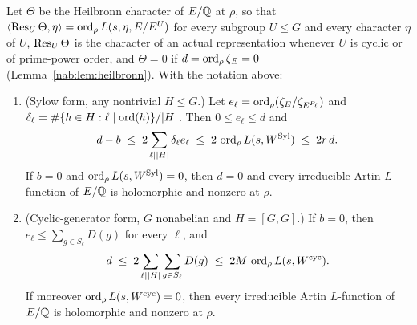 \begin{theorem}\label{nab:thm:heilbronn}
Let $\Theta$ be the Heilbronn character of $E/\mathbb{Q}$ at $\rho$, so that
$\langle\operatorname{Res}_U\Theta,\eta\rangle=\operatorname{ord}_\rho L(s,\eta,E/E^U)$ for every subgroup $U\le G$ and
every character $\eta$ of $U$, $\operatorname{Res}_U\Theta$ is the character of an actual
representation whenever $U$ is cyclic or of prime-power order, and $\Theta=0$ if
$d=\operatorname{ord}_\rho\zeta_E=0$ \textup{(Lemma~\ref{nab:lem:heilbronn})}. With the notation above:
\begin{enumerate}[label=\textup{(\alph*)}]
\item \textup{(Sylow form, any nontrivial $H\le G$.)} Let
$e_\ell=\operatorname{ord}_\rho(\zeta_E/\zeta_{E^{P_\ell}})$ and
$\delta_\ell=\#\{h\in H:\ell\mid\operatorname{ord}(h)\}/\lvert H\rvert$. Then $0\le e_\ell\le d$ and
\begin{equation}\label{nab:eq:dom}
 d-b\;\le\;2\sum_{\ell\mid\lvert H\rvert}\delta_\ell e_\ell\;\le\;2\,\operatorname{ord}_\rho L(s,W^{\mathrm{Syl}})
 \;\le\;2r\,d .
\end{equation}
If $b=0$ and $\operatorname{ord}_\rho L(s,W^{\mathrm{Syl}})=0$, then $d=0$ and every irreducible Artin
$L$-function of $E/\mathbb{Q}$ is holomorphic and nonzero at $\rho$.
\item \textup{(Cyclic-generator form, $G$ nonabelian and $H=[G,G]$.)} If $b=0$, then
$e_\ell\le\sum_{g\in S_\ell}D(g)$ for every $\ell$, and
\begin{equation}\label{nab:eq:domcyc}
 d\;\le\;2\sum_{\ell\mid\lvert H\rvert}\sum_{g\in S_\ell}D(g)\;\le\;2M\,\operatorname{ord}_\rho L(s,W^{\mathrm{cyc}}) .
\end{equation}
If moreover $\operatorname{ord}_\rho L(s,W^{\mathrm{cyc}})=0$, then every irreducible Artin $L$-function
of $E/\mathbb{Q}$ is holomorphic and nonzero at $\rho$.
\end{enumerate}
\end{theorem}
